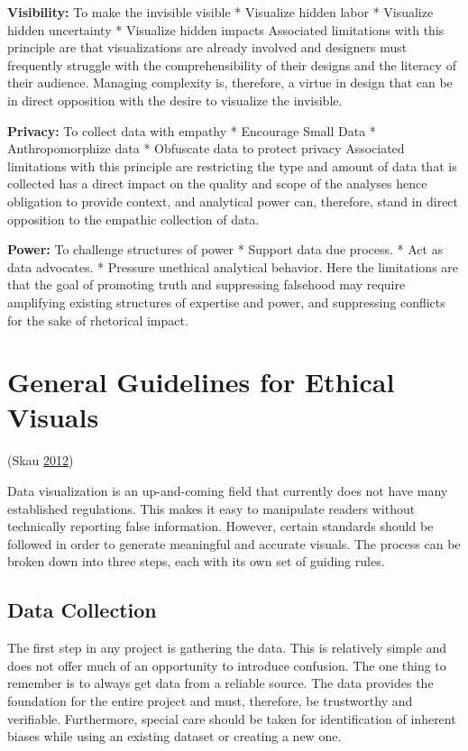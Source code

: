 \documentclass[]{book}
\begin{document}
\textbf{Visibility:} To make the invisible visible
* Visualize hidden labor
* Visualize hidden uncertainty
* Visualize hidden impacts
Associated limitations with this principle are that visualizations are already involved and designers must frequently struggle with the comprehensibility of their designs and the literacy of their audience. Managing complexity is, therefore, a virtue in design that can be in direct opposition with the desire to visualize the invisible.

\textbf{Privacy:} To collect data with empathy
* Encourage Small Data
* Anthropomorphize data
* Obfuscate data to protect privacy
Associated limitations with this principle are restricting the type and amount of data that is collected has a direct impact on the quality and scope of the analyses hence obligation to provide context, and analytical power can, therefore, stand in direct opposition to the empathic collection of data.

\textbf{Power:} To challenge structures of power
* Support data due process.
* Act as data advocates.
* Pressure unethical analytical behavior.
Here the limitations are that the goal of promoting truth and suppressing falsehood may require amplifying existing structures of expertise and power, and suppressing conflicts for the sake of rhetorical impact.

\hypertarget{general-guidelines-for-ethical-visuals}{%
\section{General Guidelines for Ethical Visuals}\label{general-guidelines-for-ethical-visuals}}

(Skau \protect\hyperlink{ref-ethics_code}{2012})

Data visualization is an up-and-coming field that currently does not have many established regulations. This makes it easy to manipulate readers without technically reporting false information. However, certain standards should be followed in order to generate meaningful and accurate visuals. The process can be broken down into three steps, each with its own set of guiding rules.

\hypertarget{data-collection}{%
\subsection{Data Collection}\label{data-collection}}

The first step in any project is gathering the data. This is relatively simple and does not offer much of an opportunity to introduce confusion. The one thing to remember is to always get data from a reliable source. The data provides the foundation for the entire project and must, therefore, be trustworthy and verifiable. Furthermore, special care should be taken for identification of inherent biases while using an existing dataset or creating a new one.
\end{document}
